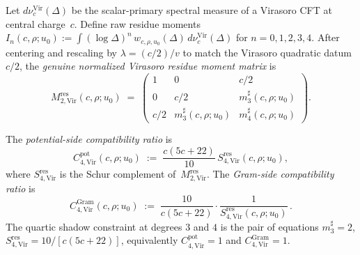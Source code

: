 \begin{definition}%
\label{def:genuine-residue-moment-matrix}%
%
Let $d\nu_c^{\mathrm{Vir}}(\Delta)$ be the scalar-primary
spectral measure of a Virasoro CFT at central charge~$c$.
Define raw residue moments
$I_n(c,\rho;u_0) :=
\int (\log\Delta)^n\,w_{c,\rho,u_0}(\Delta)\,
d\nu_c^{\mathrm{Vir}}(\Delta)$
for $n = 0,1,2,3,4$.
After centering and rescaling by $\lambda = (c/2)/v$
to match the Virasoro quadratic datum~$c/2$,
the \emph{genuine normalized Virasoro residue moment matrix} is
\begin{equation}\label{eq:residue-moment-matrix}
M_{2,\mathrm{Vir}}^{\mathrm{res}}(c,\rho;u_0)
\;=\;
\begin{pmatrix}
1 & 0 & c/2 \\
0 & c/2 & m_3^\sharp(c,\rho;u_0) \\
c/2 & m_3^\sharp(c,\rho;u_0) & m_4^\sharp(c,\rho;u_0)
\end{pmatrix}.
\end{equation}
\end{definition}

\begin{definition}%
\label{def:compatibility-ratios}%
%
The \emph{potential-side compatibility ratio} is
\[
C_{4,\mathrm{Vir}}^{\mathrm{pot}}(c,\rho;u_0)
\;:=\;
\frac{c(5c{+}22)}{10}\,
S_{4,\mathrm{Vir}}^{\mathrm{res}}(c,\rho;u_0),
\]
where $S_{4,\mathrm{Vir}}^{\mathrm{res}}$ is the Schur
complement of~$M_{2,\mathrm{Vir}}^{\mathrm{res}}$.
The \emph{Gram-side compatibility ratio} is
\[
C_{4,\mathrm{Vir}}^{\mathrm{Gram}}(c,\rho;u_0)
\;:=\;
\frac{10}{c(5c{+}22)}\cdot
\frac{1}{S_{4,\mathrm{Vir}}^{\mathrm{res}}(c,\rho;u_0)}\,.
\]
The quartic shadow constraint at degrees $3$ and $4$ is the
pair of equations
$m_3^\sharp = 2$,\;
$S_{4,\mathrm{Vir}}^{\mathrm{res}} = 10/[c(5c{+}22)]$,
equivalently $C_{4,\mathrm{Vir}}^{\mathrm{pot}} = 1$
and $C_{4,\mathrm{Vir}}^{\mathrm{Gram}} = 1$.
\end{definition}

